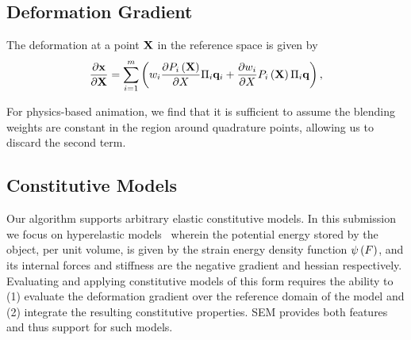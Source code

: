 \subsection{Deformation Gradient}
The deformation at a point $\mathbf{X}$ in the reference space is given by
\begin{equation}
    \frac{\partial\mathbf{x}}{\partial \mathbf{X}} = \sum_{i=1}^m\left(w_i\frac{\partial P_i\left(\mathbf{X} \right)}{\partial X}\Pi_i\mathbf{q}_i + \frac{\partial w_i}{\partial X}P_i\left(\mathbf{X} \right)\Pi_i\mathbf{q}\right), 
\end{equation}

For physics-based animation, we find that it is sufficient to assume the blending weights are constant in the region around quadrature points, allowing us to discard the second term.

\subsection{Constitutive Models}
Our algorithm supports arbitrary elastic constitutive models. 
In this submission we focus on hyperelastic models~\cite{10.1145/2343483.2343501} wherein the potential energy stored by the object, per unit volume,
is given by the strain energy density function $\psi\left(F\right)$, and its internal forces and stiffness are the negative gradient and hessian respectively. 
Evaluating and applying constitutive models of this form requires the ability to (1) evaluate the deformation gradient over the reference domain of the model and 
(2) integrate the resulting constitutive properties. 
SEM provides both features and thus support for such models.

